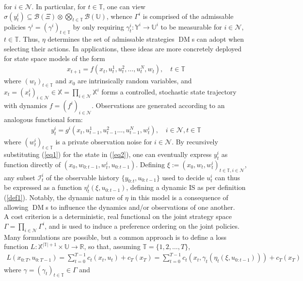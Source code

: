 \documentclass[12pt, oneside]{report}
\newcommand{\mbb}[1]{\mathbb{#1}}
\newcommand{\1}[1]{\mathbbm{1}_{\{#1\}}}
\newcommand{\mc}[1]{\mathcal{#1}}
\DeclareMathOperator{\DM}{DM} \DeclareMathOperator{\argmin}{argmin}
\theoremstyle{definition}
\begin{document}
for $i\in\mc{N}$. In particular, for $t\in\mbb{T}$, one can view $\sigma(y^i_t)\subseteq\mc{B}(\Xi)\otimes\bigotimes_{t\in\mbb{T}}\mc{B}(\mbb{U})$,
whence $\Gamma^i$ is comprised of the admissable policies $\gamma^i=(\gamma^i)_{t\in\mbb{T}}$
by only requiring $\gamma^i_t:\mbb{Y}^i\rightarrow\mbb{U}^i$ to be measurable for $i\in\mc{N}$,
$t\in\mbb{T}$. Thus, $\eta$ determines the set of admissable strategies $\DM$s
can adopt when selecting their actions. In applications, these ideas are more
concretely deployed for state space models of the form
\begin{align}
    x_{t+1}=f(x_t,u^1_t,u^2_t,\dots,u^N_t,w_t),\quad t\in\mbb{T}\label{eq1}
\end{align}
where $(w_t)_{t\in\mbb{T}}$ and $x_0$ are intrinsically random variables, and
$x_t=(x^i_t)_{i\in\mc{N}}\in\mbb{X}=\prod_{i\in\mc{N}}\mbb{X}^i$ forms a
controlled, stochastic state trajectory with dynamics $f=(f^i)_{i\in\mc{N}}$.
Observations are generated according to an analogous functional form:
\begin{align}
    y^i_t=g^i(x_t,u^1_{t-1},u^2_{t-1}\dots,u^N_{t-1},w^i_t),\quad i\in\mc{N},t\in\mbb{T}\label{eq2}
\end{align}
where $(w^i_t)_{t\in\mbb{T}}$ is a private observation noise for $i\in\mc{N}$.
By recursively substituting (\ref{eq1}) for the state in (\ref{eq2}), one can
eventually express $y^i_t$ as function directly of
$(x_0,w_{0:t-1},w^i_t,u_{0:t-1})$. Defining
$\xi:=(x_0,w_t,w^i_t)_{t\in\mbb{T},i\in\mc{N}}$, any subset $\mc{I}^i_t$ of the
observable history $\{y_{0:t},u_{0:t-1}\}$ used to decide $u^i_t$ can thus be
expressed as a function $\eta^i_t(\xi,u_{0:t-1})$, defining a dynamic IS as per
definition (\ref{def1}). Notably, the dynamic nature of $\eta$ in this model is
a consequence of allowing $\DM$s to influence the dynamics and/or observations
of one another.\\[5pt]
\indent A cost criterion is a deterministic, real functional on the joint
strategy space $\Gamma=\prod_{i\in\mc{N}}\Gamma^i$, and is used to induce a
preference ordering on the joint policies. Many formulations are possible, but a common
approach is to define a loss function
$L:\mbb{X}^{|\mbb{T}|+1}\times\mbb{U}\rightarrow\mbb{R}$, so that, assuming
$\mbb{T}=\{1,2,\dots,T\}$,
\begin{align*}
    L(x_{0:T},u_{0:T-1})=\sum_{t=0}^{T-1}c_t(x_t,u_t)+c_T(x_T)=\sum_{t=0}^{T-1}c_t(x_t,\gamma_t(\eta_t(\xi,u_{0:t-1})))+c_T(x_T)
\end{align*}
where $\gamma=(\gamma_t)_{t\in\mbb{T}}\in\Gamma$ and
\end{document}
